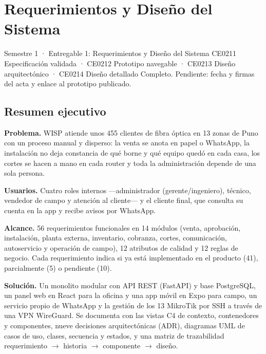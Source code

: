 \chapter{Requerimientos y Diseño del Sistema}
\label{chap:ce02-e1}

{Semestre 1 · Entregable 1: Requerimientos y Diseño del Sistema}
{CE0211 Especificación validada · CE0212 Prototipo navegable · CE0213 Diseño arquitectónico · CE0214 Diseño detallado}
{Completo. Pendiente: fecha y firmas del acta y enlace al prototipo publicado.}

\section*{Resumen ejecutivo}

\textbf{Problema.} WISP atiende unos 455 clientes de fibra óptica en 13 zonas de Puno con
un proceso manual y disperso: la venta se anota en papel o WhatsApp, la instalación no
deja constancia de qué borne y qué equipo quedó en cada casa, los cortes se hacen a mano
en cada router y toda la administración depende de una sola persona.

\textbf{Usuarios.} Cuatro roles internos ---administrador (gerente/ingeniero), técnico,
vendedor de campo y atención al cliente--- y el cliente final, que consulta su cuenta en la
app y recibe avisos por WhatsApp.

\textbf{Alcance.} 56 requerimientos funcionales en 14 módulos (venta, aprobación,
instalación, planta externa, inventario, cobranza, cortes, comunicación, autoservicio y
operación de campo), 12 atributos de calidad y 12 reglas de negocio. Cada requerimiento
indica si ya está implementado en el producto (41), parcialmente (5) o pendiente (10).

\textbf{Solución.} Un monolito modular con API REST (FastAPI) y base PostgreSQL, un panel
web en React para la oficina y una app móvil en Expo para campo, un servicio propio de
WhatsApp y la gestión de los 13 MikroTik por SSH a través de una VPN WireGuard. Se
documenta con las vistas C4 de contexto, contenedores y componentes, nueve decisiones
arquitectónicas (ADR), diagramas UML de casos de uso, clases, secuencia y estados, y una
matriz de trazabilidad requerimiento $\rightarrow$ historia $\rightarrow$ componente
$\rightarrow$ diseño.

